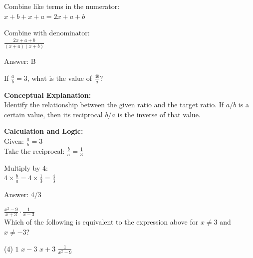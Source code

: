 \documentclass[11pt,paper=a4,answers]{exam}
\begin{document}
\begin{questions}
\begin{solution}
\vspace{10pt}

Combine like terms in the numerator: \\
$x + b + x + a = 2x + a + b$

\vspace{10pt}

Combine with denominator: \\
$\frac{2x+a+b}{(x+a)(x+b)}$

\vspace{25pt}

Answer: \colorbox{yellow!100}{B}
\end{solution}

\vspace{40pt}

\question
If $\frac{a}{b} = 3$, what is the value of $\frac{4b}{a}$?

\begin{solution}
\textbf{Conceptual Explanation:} \\
Identify the relationship between the given ratio and the target ratio. If $a/b$ is a certain value, then its reciprocal $b/a$ is the inverse of that value.

\vspace{20pt}

\textbf{Calculation and Logic:} \\
Given: $\frac{a}{b} = 3$ \\
Take the reciprocal: $\frac{b}{a} = \frac{1}{3}$

\vspace{10pt}

Multiply by 4: \\
$4 \times \frac{b}{a} = 4 \times \frac{1}{3} = \frac{4}{3}$

\vspace{25pt}

Answer: \colorbox{yellow!100}{4/3}
\end{solution}

\vspace{40pt}

\question
$\frac{x^2 - 9}{x+3} \cdot \frac{1}{x-3}$ \\
Which of the following is equivalent to the expression above for $x \neq 3$ and $x \neq -3$?
\begin{tasks}(4)
    \task $1$
    \task $x-3$
    \task $x+3$
    \task $\frac{1}{x^2-9}$
\end{tasks}


\end{questions}
\end{document}
